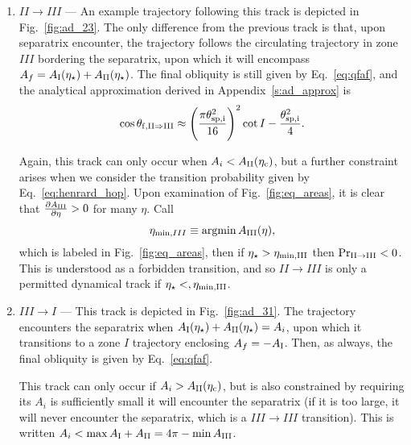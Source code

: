 \documentclass[
        fleqn,
        usenatbib,
        referee,
    ]{mnras}
\newcommand*{\pd}[2]{\frac{\partial#1}{\partial#2}}
\newcommand*{\p}[1]{\left(#1\right)}
\DeclareMathOperator*{\argmin}{argmin}
\begin{document}
\begin{enumerate}
    \item $II \to III$ --- An example trajectory following this track is
        depicted in Fig.~\ref{fig:ad_23}. The only difference from the previous
        track is that, upon separatrix encounter, the trajectory follows the
        circulating trajectory in zone $III$ bordering the separatrix, upon
        which it will encompass $A_f = A_{\rm I}(\eta_\star) + A_{\rm
        II}(\eta_\star)$. The final obliquity is still given by
        Eq.~\eqref{eq:qfaf}, and the analytical approximation derived in
        Appendix~\ref{s:ad_approx} is
        \begin{equation}
            \cos \theta_{\rm f, II \Rightarrow III} \approx
                \p{\frac{\pi \theta_{\rm sp, i}^2}{16}}^2 \cot I
                    - \frac{\theta_{\rm sp, i}^2}{4}.\label{eq:qf_23_approx}
        \end{equation}

        Again, this track can only occur when $A_i < A_{\rm II}(\eta_{\rm c})$, but a
        further constraint arises when we consider the transition probability
        given by Eq.~\eqref{eq:henrard_hop}. Upon examination of
        Fig.~\ref{fig:eq_areas}, it is clear that $\pd{A_{\rm III}}{\eta} > 0$ for
        many $\eta$. Call
        \begin{equation}
            \eta_{\min, III} \equiv \argmin A_{\rm III}(\eta),
        \end{equation}
        which is labeled in Fig.~\ref{fig:eq_areas}, then if $\eta_\star >
        \eta_{\rm \min, III}$ then $\Pr_{\rm II \to III} < 0$. This is understood as a
        forbidden transition, and so $II \to III$ is only a permitted dynamical
        track if $\eta_\star <, \eta_{\rm \min, III}$.

    \item $III \to I$ --- This track is depicted in Fig.~\ref{fig:ad_31}.
        The trajectory encounters the separatrix when $A_{\rm I}(\eta_\star) +
        A_{\rm II}(\eta_\star) = A_i$, upon which it transitions to a zone $I$
        trajectory enclosing $A_f = -A_{\rm I}$. Then, as always, the final
        obliquity is given by Eq.~\eqref{eq:qfaf}.

        This track can only occur if $A_i > A_{\rm II}(\eta_{\rm c})$, but is also
        constrained by requiring its $A_i$ is sufficiently small it will
        encounter the separatrix (if it is too large, it will never encounter
        the separatrix, which is a $III \to III$ transition). This is written
        $A_i < \max A_{\rm I} + A_{\rm II} = 4\pi - \min A_{\rm III}$.


\end{enumerate}
\end{document}
